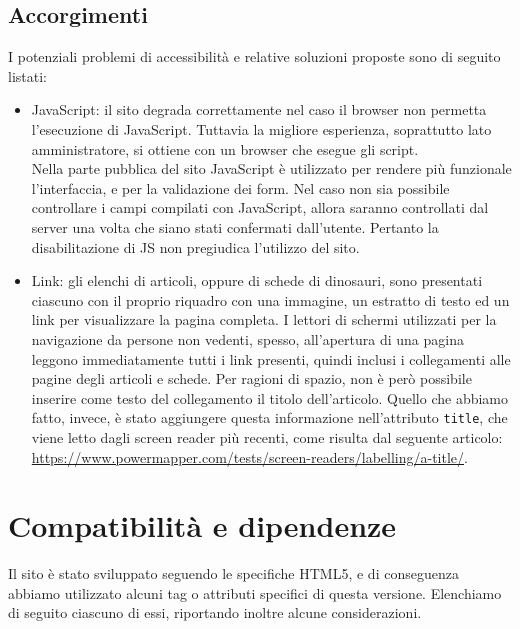 \documentclass[12pt]{article}
\newcommand{\code}[1]{\texttt{#1}}
\begin{document}
	\subsection{Accorgimenti}
	I potenziali problemi di accessibilità e relative soluzioni proposte sono di seguito listati:
	\begin{itemize}
		\item JavaScript: il sito degrada correttamente nel caso il browser non permetta l'esecuzione di JavaScript. Tuttavia la migliore esperienza, soprattutto lato amministratore, si ottiene con un browser che esegue gli script. \\
		Nella parte pubblica del sito JavaScript è utilizzato per rendere più funzionale l'interfaccia, e per la validazione dei form. Nel caso non sia possibile controllare i campi compilati con JavaScript, allora saranno controllati dal server una volta che siano stati confermati dall'utente. Pertanto la disabilitazione di JS non pregiudica l'utilizzo del sito.
		\item Link: gli elenchi di articoli, oppure di schede di dinosauri, sono presentati ciascuno con il proprio riquadro con una immagine, un estratto di testo ed un link per visualizzare la pagina completa. I lettori di schermi utilizzati per la navigazione da persone non vedenti, spesso, all'apertura di una pagina leggono immediatamente tutti i link presenti, quindi inclusi i collegamenti alle pagine degli articoli e schede.
		Per ragioni di spazio, non è però possibile inserire come testo del collegamento il titolo dell'articolo. Quello che abbiamo fatto, invece, è stato aggiungere questa informazione nell'attributo \code{title}, che viene letto dagli screen reader più recenti, come risulta dal seguente articolo: \url{https://www.powermapper.com/tests/screen-readers/labelling/a-title/}.
	\end{itemize}
	
	\section{Compatibilità e dipendenze}
	Il sito è stato sviluppato seguendo le specifiche HTML5, e di conseguenza abbiamo utilizzato alcuni tag o attributi specifici di questa versione. Elenchiamo di seguito ciascuno di essi, riportando inoltre alcune considerazioni.
\end{document}
